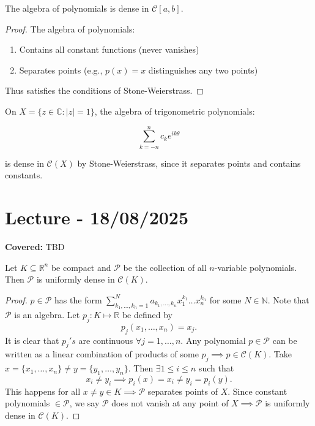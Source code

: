 \documentclass{functionspaces}
\begin{document}
\begin{corollary}
The algebra of polynomials is dense in $\mathcal{C}[a,b]$.
\end{corollary}

\begin{proof}
The algebra of polynomials:
\begin{enumerate}
\item Contains all constant functions (never vanishes)
\item Separates points (e.g., $p(x) = x$ distinguishes any two points)
\end{enumerate}
Thus satisfies the conditions of Stone-Weierstrass.
\end{proof}

\begin{example}
On $X = \{z \in \mathbb{C} : |z| = 1\}$, the algebra of trigonometric polynomials:

\[
\sum_{k=-n}^n c_k e^{ik\theta}
\]

is dense in $\mathcal{C}(X)$ by Stone-Weierstrass, since it separates points and contains constants.
\end{example}

\endgroup


\newpage
\section{Lecture - 18/08/2025}

\textbf{Covered:} TBD

\begingroup
\setlength{\parskip}{6pt}
\setlength{\parindent}{0pt}

\begin{corollary}
Let \( K \subseteq \mathbb{R}^{n} \) be compact and \( \mathcal{P} \) be the collection of all \( n \)-variable polynomials. Then \( \mathcal{P} \) is uniformly dense in \( \mathcal{C}(K) \).
\end{corollary}

\begin{proof}
\( p \in \mathcal{P} \) has the form \( \sum_{k_{1},\ldots,k_{n}=1}^{N}a_{k_{1},\ldots,k_{n}}x_{1}^{k_{1}}\ldots x_{n}^{k_{n}} \) for some \( N \in \mathbb{N} \). Note that \( \mathcal{P} \) is an algebra. Let \( p_{j}:K\mapsto\mathbb{R} \) be defined by
\[
p_{j}(x_{1},\ldots,x_{n})=x_{j}.
\]
It is clear that \( p_{j}'s \) are continuous \( \forall  j=1,\ldots,n \). Any polynomial \( p \in \mathcal{P} \) can be written as a linear combination of products of some \( p_{j} \implies p \in \mathcal{C}(K) \). Take \( x=\{x_{1},\ldots,x_{n}\} \neq y=\{y_{1},\ldots,y_{n}\} \). Then \( \exists  1 \leq i \leq n \) such that
\[
x_{i} \neq y_{i} \implies p_{i}(x)=x_{i} \neq y_{i}=p_{i}(y).
\]
This happens for all \( x \neq y \in K \implies \mathcal{P} \) separates points of \( X \). Since constant polynomials \( \in \mathcal{P} \), we say \( \mathcal{P} \) does not vanish at any point of \( X \implies \mathcal{P} \) is uniformly dense in \( \mathcal{C}(K) \).
\end{proof}
\end{document}
